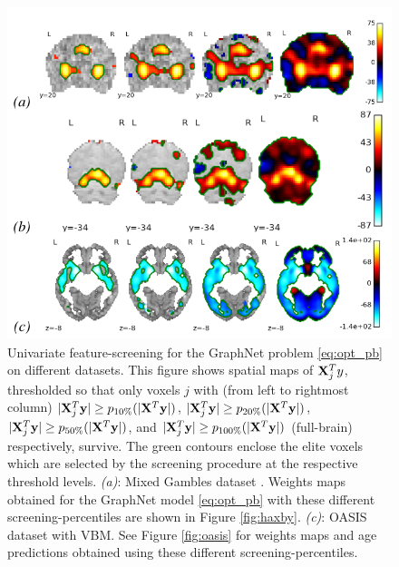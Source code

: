  \begin{figure}[!htb]
   \includegraphics[width=1\linewidth]{figures/screening.png}
\caption{Univariate feature-screening for the
  GraphNet
  problem \eqref{eq:opt_pb} on
  different datasets.
  This figure shows spatial maps of
  $\mathbf{X}^T_jy$, thresholded so that only voxels $j$ with (from left to
  rightmost column)  $|\mathbf{X}^T_j\mathbf{y}| \ge p_{10\%}(|\mathbf{X}^T\mathbf{y}|)$, $|\mathbf{X}^T_j\mathbf{y}| \ge
  p_{20\%}(|\mathbf{X}^T\mathbf{y}|)$, $|\mathbf{X}^T_j\mathbf{y}| \ge p_{50\%}(|\mathbf{X}^T\mathbf{y}|)$, and $|\mathbf{X}^T_j\mathbf{y}|
  \ge p_{100\%}(|\mathbf{X}^T\mathbf{y}|)$ (full-brain) respectively, survive. The
  green contours enclose the elite voxels which are selected by the
  screening procedure at the respective threshold
  levels. \textit{(a)}: Mixed Gambles dataset
   \citep{jimura2012}.%
  Weights maps obtained for the GraphNet
  model \eqref{eq:opt_pb} with these different
  screening-percentiles are shown in Figure
  \ref{fig:haxby}. \textit{(c)}: OASIS dataset  \citep{marcus2007open}
  with VBM. See Figure \ref{fig:oasis} for weights maps and
  age predictions obtained using these different
  screening-percentiles. %
}

\label{fig:screening}
\end{figure}

